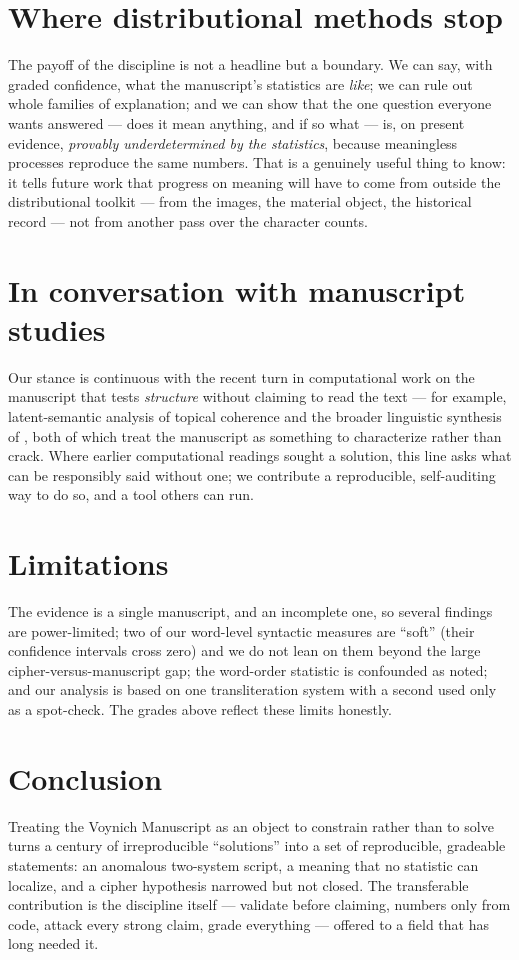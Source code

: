 \documentclass[11pt]{article}
\begin{document}
\section{Where distributional methods stop}
The payoff of the discipline is not a headline but a boundary. We can say, with graded confidence,
what the manuscript's statistics are \emph{like}; we can rule out whole families of explanation; and
we can show that the one question everyone wants answered --- does it mean anything, and if so what
--- is, on present evidence, \emph{provably underdetermined by the statistics}, because meaningless
processes reproduce the same numbers. That is a genuinely useful thing to know: it tells future work
that progress on meaning will have to come from outside the distributional toolkit --- from the
images, the material object, the historical record --- not from another pass over the character
counts.

\section{In conversation with manuscript studies}
Our stance is continuous with the recent turn in computational work on the manuscript that tests
\emph{structure} without claiming to read the text --- for example, latent-semantic analysis of
topical coherence \citep{layfield2026lsa} and the broader linguistic synthesis of
\citet{bowern2021linguistics}, both of which treat the manuscript as something to characterize
rather than crack. Where earlier computational readings sought a solution, this line asks what can
be responsibly said without one; we contribute a reproducible, self-auditing way to do so, and a
tool others can run.

\section{Limitations}
The evidence is a single manuscript, and an incomplete one, so several findings are
power-limited; two of our word-level syntactic measures are ``soft'' (their confidence intervals
cross zero) and we do not lean on them beyond the large cipher-versus-manuscript gap; the
word-order statistic is confounded as noted; and our analysis is based on one transliteration
system with a second used only as a spot-check. The grades above reflect these limits honestly.

\section{Conclusion}
Treating the Voynich Manuscript as an object to constrain rather than to solve turns a century of
irreproducible ``solutions'' into a set of reproducible, gradeable statements: an anomalous
two-system script, a meaning that no statistic can localize, and a cipher hypothesis narrowed but
not closed. The transferable contribution is the discipline itself --- validate before claiming,
numbers only from code, attack every strong claim, grade everything --- offered to a field that has
long needed it.
\end{document}
